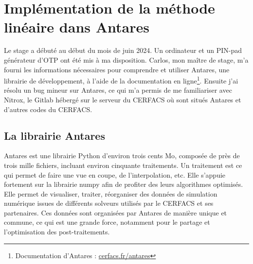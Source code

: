 \chapter{Implémentation de la méthode linéaire dans Antares}




Le stage a débuté au début du mois de juin 2024. Un ordinateur et un PIN-pad générateur d'\ac{OTP} ont été mis à ma disposition. Carlos, mon maître de stage, m'a fourni les informations nécessaires pour comprendre et utiliser Antares\cite{antares}, une librairie de développement, à l'aide de la documentation en ligne\footnote{Documentation d'Antares : \href{https://cerfacs.fr/antares/}{cerfacs.fr/antares}}. Ensuite j'ai résolu un bug mineur sur Antares, ce qui m'a permis de me familiariser avec Nitrox, le Gitlab hébergé sur le serveur du CERFACS où sont situés Antares et d'autres codes du CERFACS.


\section{La librairie Antares}

Antares est une librairie Python d'environ trois cents \ac{Mo}, composée de près de trois mille fichiers, incluant environ cinquante traitements. Un traitement est ce qui permet de faire une vue en coupe, de l'interpolation, etc.
Elle s'appuie fortement sur la librairie numpy afin de profiter des leurs algorithmes optimisés.
Elle permet de visualiser, traiter, réorganiser des données de simulation numérique issues de différents solveurs utilisés par le CERFACS et ses partenaires. Ces données sont organisées par Antares de manière unique et commune, ce qui est une grande force, notamment pour le partage et l'optimisation des post-traitements.

